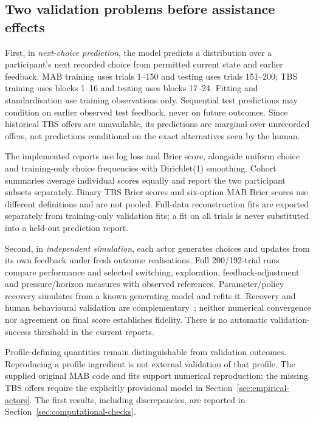 \documentclass[11pt,a4paper]{article}
\begin{document}
\subsection{Two validation problems before assistance effects}
First, in \emph{next-choice prediction}, the model predicts a distribution over a participant's next recorded choice from permitted current state and earlier feedback. MAB training uses trials 1--150 and testing uses trials 151--200; TBS training uses blocks 1--16 and testing uses blocks 17--24. Fitting and standardisation use training observations only. Sequential test predictions may condition on earlier observed test feedback, never on future outcomes. Since historical TBS offers are unavailable, its predictions are marginal over unrecorded offers, not predictions conditional on the exact alternatives seen by the human.

The implemented reports use log loss and Brier score, alongside uniform choice and training-only choice frequencies with Dirichlet(1) smoothing. Cohort summaries average individual scores equally and report the two participant subsets separately. Binary TBS Brier scores and six-option MAB Brier scores use different definitions and are not pooled. Full-data reconstruction fits are exported separately from training-only validation fits; a fit on all trials is never substituted into a held-out prediction report.

Second, in \emph{independent simulation}, each actor generates choices and updates from its own feedback under fresh outcome realisations. Full 200/192-trial runs compare performance and selected switching, exploration, feedback-adjustment and pressure/horizon measures with observed references. Parameter/policy recovery simulates from a known generating model and refits it. Recovery and human behavioural validation are complementary~\cite{wilson}; neither numerical convergence nor agreement on final score establishes fidelity. There is no automatic validation-success threshold in the current reports.

Profile-defining quantities remain distinguishable from validation outcomes. Reproducing a profile ingredient is not external validation of that profile. The supplied original MAB code and fits support numerical reproduction; the missing TBS offers require the explicitly provisional model in Section~\ref{sec:empirical-actors}. The first results, including discrepancies, are reported in Section~\ref{sec:computational-checks}.
\end{document}
